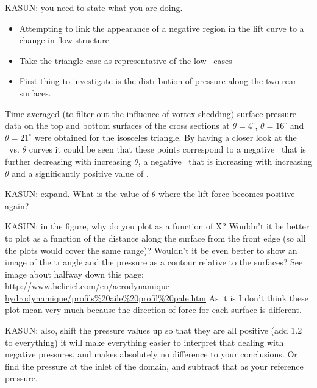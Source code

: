 KASUN: you need to state what you are doing.
\begin{itemize}
\item Attempting to link the appearance of a negative region in the
  lift curve to a change in flow structure
\item Take the triangle case as representative of the low \ratio\
  cases
\item First thing to investigate is the distribution of pressure along
  the two rear surfaces.
\end{itemize}

Time averaged (to filter out the influence of vortex shedding) surface pressure data  on the top and bottom surfaces of the cross sections at $\theta=4^{\circ}$, $\theta=16^{\circ}$ and $\theta=21^{\circ}$ were obtained for the isosceles triangle. By having a closer look at the \cy\ vs. $\theta$ curves it could be seen that these points correspond to a negative \cy\ that is further decreasing with increasing $\theta$, a negative \cy\ that is increasing with increasing $\theta$ and a significantly positive value of \cy.

KASUN: expand. What is the value of $\theta$ where the lift force becomes positive again? 
 
 

KASUN: in the figure, why do you plot as a function of X? Wouldn't it be better to plot as a function of the distance along the surface from the front edge (so all the plots would cover the same range)? Wouldn't it be even better to show an image of the triangle and the pressure as a contour relative to the surfaces? See image about halfway down this page: \url{http://www.heliciel.com/en/aerodynamique-hydrodynamique/profils\%20aile\%20profil\%20pale.htm} As it is I don't think these plot mean very much because the direction of force for each surface is different.

KASUN: also, shift the pressure values up so that they are all positive (add 1.2 to everything) it will make everything easier to interpret that dealing with negative pressures, and makes absolutely no difference to your conclusions. Or find the pressure at the inlet of the domain, and subtract that as your reference pressure.
 

